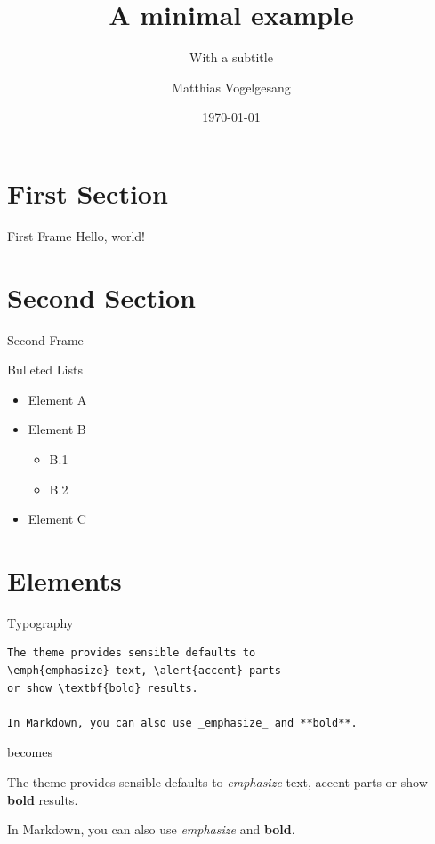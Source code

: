 \documentclass[12pt,ignorenonframetext,]{beamer}
\title[]{A minimal example}
\subtitle{With a subtitle}
\author[
        Matthias Vogelgesang
    ]{Matthias Vogelgesang}
\institute[
    ]{
    Centre for Modern Beamer Themes
    }
\date[
      \today
  ]{
      \today
        }
\providecommand{\tightlist}{%
  \setlength{\itemsep}{0pt}\setlength{\parskip}{0pt}}
\begin{document}
  \begin{frame}[plain]
  \titlepage
  \end{frame}



\hypertarget{first-section}{%
\section{First Section}\label{first-section}}

\begin{frame}{First Frame}
\protect\hypertarget{first-frame}{}
Hello, world!
\end{frame}

\hypertarget{second-section}{%
\section{Second Section}\label{second-section}}

\begin{frame}{Second Frame}
\protect\hypertarget{second-frame}{}
\begin{block}{Bulleted Lists}
\protect\hypertarget{bulleted-lists}{}
\begin{itemize}
\tightlist
\item
  Element A
\item
  Element B

  \begin{itemize}
  \tightlist
  \item
    B.1
  \item
    B.2
  \end{itemize}
\item
  Element C
\end{itemize}
\end{block}
\end{frame}

\hypertarget{elements}{%
\section{Elements}\label{elements}}

\begin{frame}[fragile]{Typography}
\protect\hypertarget{typography}{}
\begin{verbatim}
The theme provides sensible defaults to
\emph{emphasize} text, \alert{accent} parts
or show \textbf{bold} results.

In Markdown, you can also use _emphasize_ and **bold**.
\end{verbatim}

\begin{center}becomes\end{center}

The theme provides sensible defaults to \emph{emphasize} text,
\alert{accent} parts or show \textbf{bold} results.

In Markdown, you can also use \emph{emphasize} and \textbf{bold}.
\end{frame}
\end{document}
